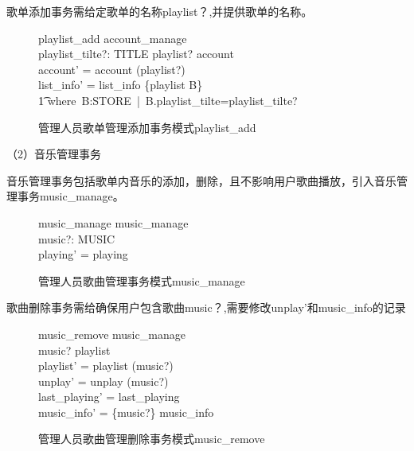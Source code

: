 \documentclass[14pt]{article}
\numberwithin{figure}{subsection}
\begin{document}
\clearpage
歌单添加事务需给定歌单的名称playlist？,并提供歌单的名称。

\vspace{-0.5cm}
\begin{figure}[H]
    \setlength{\abovecaptionskip}{0.cm}
    \setlength{\belowcaptionskip}{0.cm}
    \begin{schema}{playlist\_add}
        account\_manage\\
        playlist\_tilte?: TITLE
        \where
        playlist? \not\in account\\
        account' = account \cup (playlist?)\\
        list\_info' = list\_info \oplus \{playlist \mapsto B\}\\
        \t1 where\ B:STORE\ |\ B.playlist\_tilte=playlist\_tilte?\\
    \end{schema}
    \caption{管理人员歌单管理添加事务模式playlist\_add}
\end{figure}

\vspace{-0.5cm}
（2）音乐管理事务

音乐管理事务包括歌单内音乐的添加，删除，且不影响用户歌曲播放，引入音乐管理事务music\_manage。
\vspace{-0.5cm}
\begin{figure}[H]
    \setlength{\abovecaptionskip}{0.cm}
    \setlength{\belowcaptionskip}{0.cm}
    \begin{schema}{music\_manage}
        music\_manage\\
        music?: MUSIC\\
        \where
        playing' = playing\\
    \end{schema}
    \caption{管理人员歌曲管理事务模式music\_manage}
\end{figure}

\vspace*{-0.5cm}
歌曲删除事务需给确保用户包含歌曲music？,需要修改unplay'和music\_info的记录
\vspace{-0.7cm}
\begin{figure}[H]
    \setlength{\abovecaptionskip}{0.cm}
    \setlength{\belowcaptionskip}{0.cm}
    \begin{schema}{music\_remove}
        music\_manage\\
        \where
        music? \in playlist\\
        playlist' = playlist \setminus (music?)\\
        unplay' = unplay \setminus (music?)\\
        last\_playing' = last\_playing\\
        music\_info' = \{music?\} \ndres music\_info
    \end{schema}
    \caption{管理人员歌曲管理删除事务模式music\_remove}
\end{figure}
\end{document}
